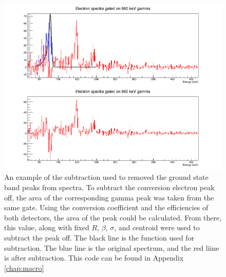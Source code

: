 \begin{figure}
    \centering
    \includegraphics[scale=0.4]{Analysis_Figs/Subtraction_SiLiAll_960.png}
    \caption[An example of the subtraction used to removed the ground state band peaks from spectra.]{An example of the subtraction used to removed the ground state band peaks from spectra. To subtract the conversion electron peak off, the area of the corresponding gamma peak was taken from the same gate. Using the conversion coefficient and the efficiencies of both detectors, the area of the peak could be calculated. From there, this value, along with fixed $R$, $\beta$, $\sigma$, and centroid were used to subtract the peak off. The black line is the function used for subtraction. The blue line is the original spectrum, and the red liine is after subtraction. This code can be found in Appendix \ref{chap:macro}}
    \label{fig:subtraction}
\end{figure}